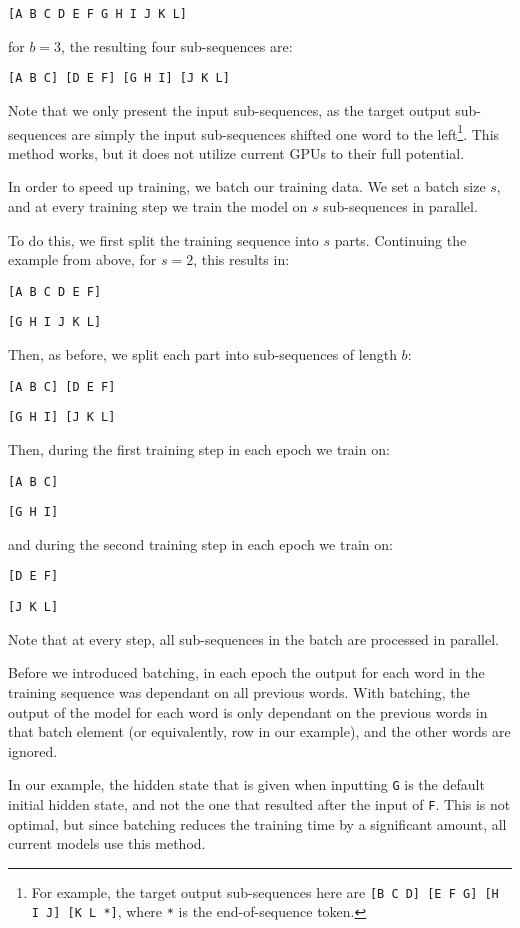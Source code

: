 \documentclass[11pt,a4paper]{article}
\begin{document}
\texttt{[A B C D E F G H I J K L]}

\noindent for $b = 3$, the resulting four sub-sequences are:

\texttt{[A B C] [D E F] [G H I] [J K L]}

Note that we only present the input sub-sequences, as the target output sub-sequences are simply the input sub-sequences shifted one word to the left\footnote{For example, the target output sub-sequences here are \texttt{[B C D] [E F G] [H I J] [K L *]}, where \texttt{*} is the end-of-sequence token.}. 
This method works, but it does not utilize current GPUs to their full potential. 

In order to speed up training, we batch our training data. We set a batch size $s$, and at every training step we train the model on $s$ sub-sequences in parallel. 

To do this, we first split the training sequence into $s$ parts. Continuing the example from above, for $s=2$, this results in:

\texttt{[A B C D E F]}

\texttt{[G H I J K L]}

Then, as before, we split each part into sub-sequences of length $b$:


\texttt{[A B C] [D E F]}

\texttt{[G H I] [J K L]}

\noindent Then, during the first training step in each epoch we train on:

\texttt{[A B C] }

\texttt{[G H I] }

\noindent and during the second training step in each epoch we train on:

\texttt{[D E F] }

\texttt{[J K L]}

Note that at every step, all sub-sequences in the batch are processed in parallel. 

Before we introduced batching, in each epoch the output for each word in the training sequence was dependant on all previous words. 
With batching, the output of the model for each word is only dependant on the previous words in that batch element (or equivalently, row in our example), and the other words are ignored.


In our example, the hidden state that is given when inputting \texttt{G} is the default initial hidden state, and not the one that resulted after the input of \texttt{F}. This is not optimal, but since batching reduces the training time by a significant amount, all current models use this method. 
\end{document}

